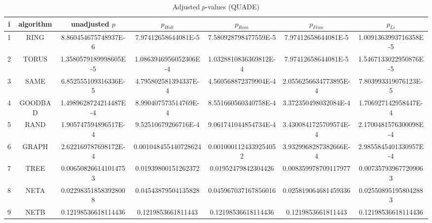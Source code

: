 \documentclass[a4paper,10pt]{article}
\begin{document}
\begin{landscape}
\begin{table}[!htp]
\centering\scriptsize
\caption{Adjusted $p$-values (QUADE)}
\begin{tabular}{ccccccc}
i&algorithm&unadjusted $p$&$p_{Holl}$&$p_{Rom}$&$p_{Finn}$&$p_{Li}$\\
\hline
1& RING&8.860454675748937E-6&7.97412658644081E-5&7.580928798477559E-5&7.97412658644081E-5&1.0091363993716358E-5\\
2& TORUS&1.3580579189998605E-5&1.0863946956052306E-4&1.0328810836369812E-4&7.97412658644081E-5&1.5467133022950876E-5\\
3& SAME&6.852555109316336E-5&4.795802581394337E-4&4.560568872379904E-4&2.0556256634773895E-4&7.803993319076123E-5\\
4& GOODBAD&1.4989628724214487E-4&8.990407573514769E-4&8.551660560340758E-4&3.372350498032084E-4&1.706927142958447E-4\\
5& RAND&1.905747594896517E-4&9.52510679266716E-4&9.061741044854734E-4&3.4300841725709574E-4&2.1700481576300098E-4\\
6& GRAPH&2.622169787698172E-4&0.001048455440728624&0.0010001124339254052&3.9329968287382666E-4&2.9855845401330957E-4\\
7& TREE&0.006508266141014753&0.01939800151262372&0.01952479842304426&0.008359978709117977&0.007357939677209063\\
8& NETA&0.022983518583928008&0.04543879504135828&0.045967037167856016&0.025819064681459336&0.025508951958042883\\
9& NETB&0.12198536618114436&0.1219853661811443&0.12198536618114436&0.1219853661811443&0.12198536618114436\\
\hline
\end{tabular}
\end{table}

\end{landscape}
\end{document}
